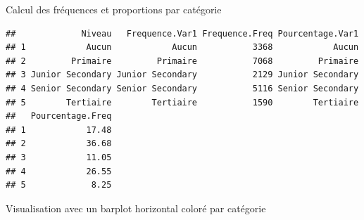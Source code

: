 \documentclass[
]{article}
\newenvironment{Shaded}{\begin{snugshade}}{\end{snugshade}}
\newcommand{\AttributeTok}[1]{\textcolor[rgb]{0.13,0.29,0.53}{#1}}
\newcommand{\DecValTok}[1]{\textcolor[rgb]{0.00,0.00,0.81}{#1}}
\newcommand{\FunctionTok}[1]{\textcolor[rgb]{0.13,0.29,0.53}{\textbf{#1}}}
\newcommand{\NormalTok}[1]{#1}
\newcommand{\OtherTok}[1]{\textcolor[rgb]{0.56,0.35,0.01}{#1}}
\newcommand{\SpecialCharTok}[1]{\textcolor[rgb]{0.81,0.36,0.00}{\textbf{#1}}}
\begin{document}
Calcul des fréquences et proportions par catégorie

\begin{Shaded}
\end{Shaded}

\begin{verbatim}
##             Niveau   Frequence.Var1 Frequence.Freq Pourcentage.Var1
## 1            Aucun            Aucun           3368            Aucun
## 2         Primaire         Primaire           7068         Primaire
## 3 Junior Secondary Junior Secondary           2129 Junior Secondary
## 4 Senior Secondary Senior Secondary           5116 Senior Secondary
## 5        Tertiaire        Tertiaire           1590        Tertiaire
##   Pourcentage.Freq
## 1            17.48
## 2            36.68
## 3            11.05
## 4            26.55
## 5             8.25
\end{verbatim}

Visualisation avec un barplot horizontal coloré par catégorie
\end{document}
